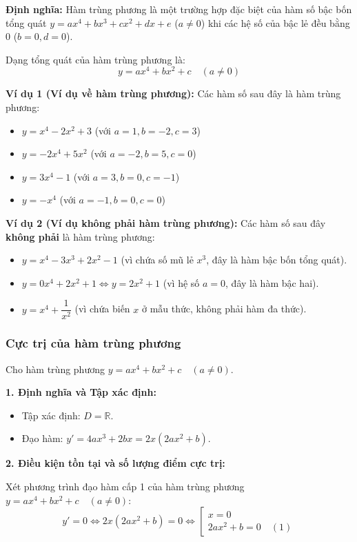 \textbf{Định nghĩa:} 
Hàm trùng phương là một trường hợp đặc biệt của hàm số bậc bốn tổng quát $y = ax^4 + bx^3 + cx^2 + dx + e$ ($a \neq 0$) khi các hệ số của bậc lẻ đều bằng $0$ ($b = 0, d = 0$). 

Dạng tổng quát của hàm trùng phương là:
\[ y = ax^4 + bx^2 + c \quad (a \neq 0) \]

\textbf{Ví dụ 1 (Ví dụ về hàm trùng phương):}
Các hàm số sau đây là hàm trùng phương:
\begin{itemize}
    \item $y = x^4 - 2x^2 + 3$ (với $a = 1, b = -2, c = 3$)
    \item $y = -2x^4 + 5x^2$ (với $a = -2, b = 5, c = 0$)
    \item $y = 3x^4 - 1$ (với $a = 3, b = 0, c = -1$)
    \item $y = -x^4$ (với $a = -1, b = 0, c = 0$)
\end{itemize}

\textbf{Ví dụ 2 (Ví dụ không phải hàm trùng phương):}
Các hàm số sau đây \textbf{không phải} là hàm trùng phương:
\begin{itemize}
    \item $y = x^4 - 3x^3 + 2x^2 - 1$ (vì chứa số mũ lẻ $x^3$, đây là hàm bậc bốn tổng quát).
    \item $y = 0x^4 + 2x^2 + 1 \iff y = 2x^2 + 1$ (vì hệ số $a = 0$, đây là hàm bậc hai).
    \item $y = x^4 + \dfrac{1}{x^2}$ (vì chứa biến $x$ ở mẫu thức, không phải hàm đa thức).
\end{itemize}


\subsubsection{Cực trị của hàm trùng phương}


Cho hàm trùng phương $y = ax^4 + bx^2 + c \quad (a \neq 0)$.

\textbf{1. Định nghĩa và Tập xác định:}
\begin{itemize}
    \item Tập xác định: $D = \mathbb{R}$.
    \item Đạo hàm: $y' = 4ax^3 + 2bx = 2x(2ax^2 + b)$.
\end{itemize}

\textbf{2. Điều kiện tồn tại và số lượng điểm cực trị:}

Xét phương trình đạo hàm cấp 1 của hàm trùng phương $y = ax^4 + bx^2 + c \quad (a \neq 0)$:
\[ y' = 0 \iff 2x(2ax^2 + b) = 0 \iff \left[\begin{array}{l} x = 0 \\ 2ax^2 + b = 0 \quad (1) \end{array}\right. \]

